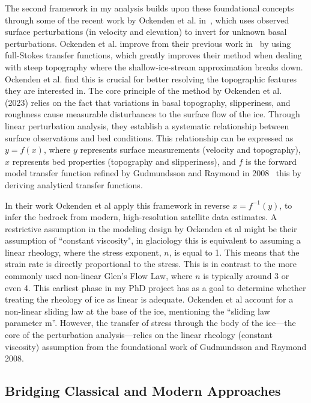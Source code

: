 The second framework in my analysis builds upon these foundational concepts through some of the recent work by Ockenden et al. in~\cite{Ockenden_2023}, which uses observed surface perturbations (in velocity and elevation) to invert for unknown basal perturbations. Ockenden et al. improve from their previous work in~\cite{Ockenden_2022} by using full-Stokes transfer functions, which greatly improves their method when dealing with steep topography where the shallow-ice-stream approximation breaks down. Ockenden et al. find this is crucial for better resolving the topographic features they are interested in. The core principle of the method by Ockenden et al. (2023) relies on the fact that variations in basal topography, slipperiness, and roughness cause measurable disturbances to the surface flow of the ice. Through linear perturbation analysis, they establish a systematic relationship between surface observations and bed conditions. This relationship can be expressed as $y=f(x)$, where $y$ represents surface measurements (velocity and topography), $x$ represents bed properties (topography and slipperiness), and $f$ is the forward model transfer function refined by Gudmundsson and Raymond in 2008~\cite{Gudmundsson_2008} this by deriving analytical transfer functions. 

In their work Ockenden et al apply this framework in reverse $x=f^{-1}(y)$, to infer the bedrock from modern, high-resolution satellite data estimates. A restrictive assumption in the modeling design by Ockenden et al might be their assumption of ``constant viscosity", in glaciology this is equivalent to assuming a linear rheology, where the stress exponent, $n$, is equal to 1. This means that the strain rate is directly proportional to the stress. This is in contrast to the more commonly used non-linear Glen's Flow Law, where $n$ is typically around 3 or even 4. This earliest phase in my PhD project has as a goal to determine whether treating the rheology of ice as  linear is adequate. Ockenden et al account for a non-linear sliding law at the base of the ice, mentioning the ``sliding law parameter m''. However, the transfer of stress through the body of the ice—the core of the perturbation analysis—relies on the linear rheology (constant viscosity) assumption from the foundational work of Gudmundsson and Raymond 2008.


\subsection{Bridging Classical and Modern Approaches}

